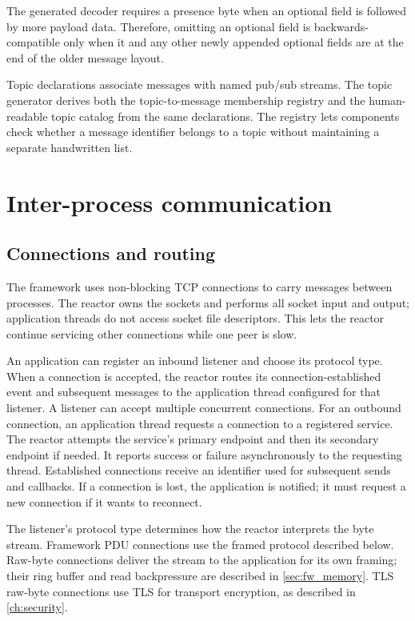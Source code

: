 The generated decoder requires a presence byte when an optional field is
followed by more payload data. Therefore, omitting an optional field is
backwards-compatible only when it and any other newly appended optional
fields are at the end of the older message layout.

Topic declarations associate messages with named pub/sub streams. The topic
generator derives both the topic-to-message membership registry and the
human-readable topic catalog from the same declarations. The registry lets
components check whether a message identifier belongs to a topic without
maintaining a separate handwritten list.

\section{Inter-process communication}
\label{sec:fw_ipc}

\subsection{Connections and routing}

The framework uses non-blocking TCP connections to carry messages between
processes. The reactor owns the sockets and performs all socket input and
output; application threads do not access socket file descriptors. This lets
the reactor continue servicing other connections while one peer is slow.

An application can register an inbound listener and choose its protocol type.
When a connection is accepted, the reactor routes its connection-established
event and subsequent messages to the application thread configured for that
listener. A listener can accept multiple concurrent connections. For an
outbound connection, an application thread requests a connection to a
registered service. The reactor attempts the service's primary endpoint and
then its secondary endpoint if needed. It reports success or failure
asynchronously to the requesting thread. Established connections receive an
identifier used for subsequent sends and callbacks. If a connection is lost,
the application is notified; it must request a new connection if it wants to
reconnect.

The listener's protocol type determines how the reactor interprets the byte
stream. Framework PDU connections use the framed protocol described below.
Raw-byte connections deliver the stream to the application for its own
framing; their ring buffer and read backpressure are described in
\cref{sec:fw_memory}. TLS raw-byte connections use TLS for transport
encryption, as described in \cref{ch:security}.

